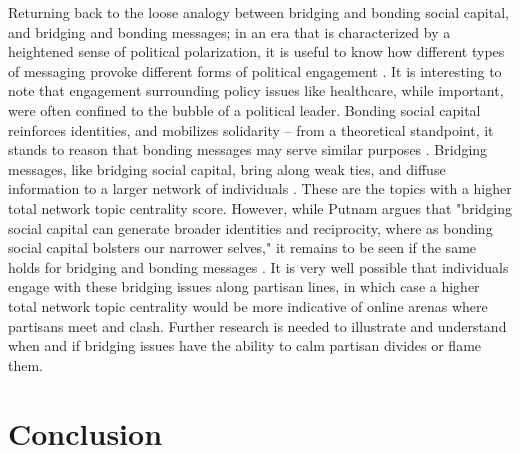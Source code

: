 Returning back to the loose analogy between bridging and bonding social capital,
and bridging and bonding messages; in an era that is characterized by a
heightened sense of political polarization, it is useful to know how different
types of messaging provoke different forms of political engagement
\cite{schipper2018political}. It is interesting to note that engagement
surrounding policy issues like healthcare, while important, were often confined
to the bubble of a political leader. Bonding social capital reinforces
identities, and mobilizes solidarity -- from a theoretical standpoint, it stands
to reason that bonding messages may serve similar purposes
\cite{putnam2000bowling}. Bridging messages, like bridging social capital, bring
along weak ties, and diffuse information to a larger network of individuals
\cite{putnam2000bowling,gil2012social}. These are the topics with a higher total
network topic centrality score. However, while Putnam argues that "bridging
social capital can generate broader identities and reciprocity, where as bonding
social capital bolsters our narrower selves," it remains to be seen if the same
holds for bridging and bonding messages \cite{putnam2000bowling}. It is very
well possible that individuals engage with these bridging issues along partisan
lines, in which case a higher total network topic centrality would be more
indicative of online arenas where partisans meet and clash. Further research is
needed to illustrate and understand when and if bridging issues have the ability
to calm partisan divides or flame them. 

\section{Conclusion}

